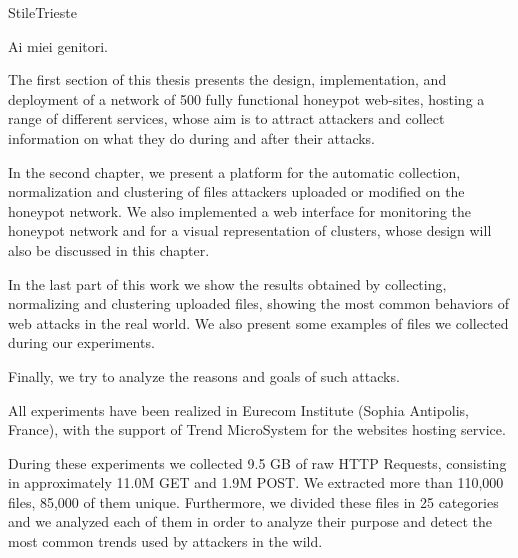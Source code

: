 \documentclass[pdfa%
,cucitura%
]{toptesi}
\begin{document}

\expandafter\ifx\csname StileTrieste\endcsname\relax
    \frontespizio
\else
    \paginavuota
    \begin{dedica}
        Ai miei genitori.
    \end{dedica}
    \tomo
\fi


\sommario

The first section of this thesis presents the design, implementation, and deployment of a network of 500 fully functional honeypot web-sites, hosting a range of different services, whose aim is to attract attackers and collect information on what they do during and after their attacks.

In the second chapter, we present a platform for the automatic collection, normalization and clustering of files attackers uploaded or modified on the honeypot network. We also implemented a web interface for monitoring the honeypot network and for a visual representation of clusters, whose design will also be discussed in this chapter.

In the last part of this work we show the results obtained by collecting, normalizing and clustering uploaded files, showing the most common behaviors of web attacks in the real world. We also present some examples of files we collected during our experiments.

Finally, we try to analyze the reasons and goals of such attacks.

All experiments have been realized in Eurecom Institute (Sophia Antipolis, France), with the support of Trend MicroSystem for the websites hosting service.

During these experiments we collected 9.5 GB of raw HTTP Requests, consisting in approximately 11.0M GET and 1.9M POST. We extracted more than 110,000 files, 85,000 of them unique. Furthermore, we divided these files in 25 categories and we analyzed each of them in order to analyze their purpose and detect the most common trends used by attackers in the wild.


\end{document}

